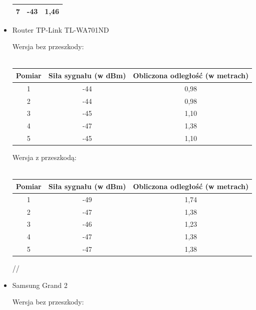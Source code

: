 \documentclass{article}
\begin{document}
\begin{itemize}
\begin{center}
\begin{minipage}{\linewidth}
\begin{tabular}{|c|c|c|}
						\hline 
						7 & -43 & 1,46 \\ 
						\hline 
					\end{tabular}				
					\end{minipage} 
				\end{center}
			\item Router TP-Link TL-WA701ND
			\begin{center}
				\begin{minipage}{\linewidth}
					Wersja bez przeszkody:\\\\
					\begin{tabular}{|c|c|c|}
						\hline 
						Pomiar & Siła sygnału (w dBm) & Obliczona odległość (w metrach) \\ 
						\hline 
						1 & -44 & 0,98 \\ 
						\hline 
						2 & -44 & 0,98 \\ 
						\hline 
						3 & -45 & 1,10 \\ 
						\hline 
						4 & -47 & 1,38 \\ 
						\hline 
						5 & -45 & 1,10 \\ 
						\hline 
					\end{tabular} 
				\end{minipage} 
			\end{center}
			\begin{center}
				\begin{minipage}{\linewidth}
					Wersja z przeszkodą:\\\\
					\begin{tabular}{|c|c|c|}
						\hline 
						Pomiar & Siła sygnału (w dBm) & Obliczona odległość (w metrach) \\ 
						\hline 
						1 & -49 & 1,74 \\ 
						\hline 
						2 & -47 & 1,38 \\ 
						\hline 
						3 & -46 & 1,23 \\ 
						\hline 
						4 & -47 & 1,38 \\ 
						\hline 
						5 & -47 & 1,38 \\ 
						\hline 
					\end{tabular}//
				\end{minipage} 
			\end{center}
		\item Samsung Grand 2
		\begin{center}
			\begin{minipage}{\linewidth}
				Wersja bez przeszkody:\\\\

\end{minipage}
\end{center}
\end{itemize}
\end{document}
